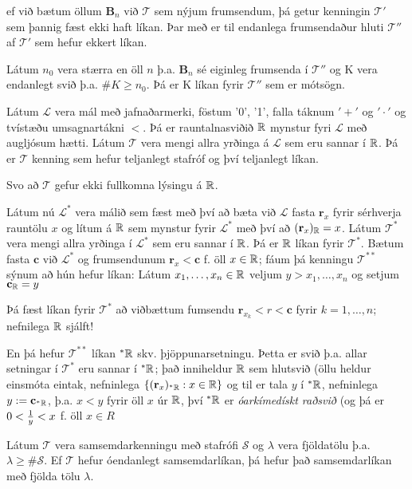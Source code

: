 \documentclass[12pt]{book}
\newcommand{\cT}{\mathcal{T}}
\newcommand{\cL}{\mathcal{L}}
\newcommand{\mb}[1]{\mathbf{#1}}
\newcommand{\mc}[1]{\mathcal{#1}}
\begin{document}
ef við bætum öllum $\mb{B}_n$ við $\cT$ sem nýjum frumsendum, þá getur kenningin
$\cT'$ sem þannig fæst ekki haft líkan. Þar með er til endanlega frumsendaður hluti
$\cT''$ af $\cT'$ sem hefur ekkert líkan.

Látum $n_0$ vera stærra en öll $n$ þ.a. $\mb{B}_n$ sé eiginleg frumsenda í
$\cT''$ og K vera endanlegt svið þ.a. $\#K \geq n_0$. Þá er K líkan fyrir
$\cT''$ sem er mótsögn.

\begin{daemi}
  Látum $\cL$ vera mál með jafnaðarmerki, föstum '0', '1',
  falla táknum $'+'$ og $'\cdot'$ og tvístæðu umsagnartákni $<$.
  Þá er rauntalnasviðið $\mathbb{R}$ mynstur fyri $\cL$ með augljósum hætti.
  Látum $\cT$ vera mengi allra yrðinga á $\cL$ sem eru sannar í $\mathbb{R}$.
  Þá er $\cT$ kenning sem hefur teljanlegt stafróf og því teljanlegt líkan.

  Svo að $\cT$ gefur ekki fullkomna lýsingu á $\mathbb{R}$.

  Látum nú $\cL^{*}$ vera málið sem fæst með því að bæta við $\cL$ fasta 
  $\mb{r}_x$ fyrir sérhverja rauntölu $x$ og lítum á $\mathbb{R}$
  sem mynstur fyrir $\cL^*$  með því að 
  $(\mb{r}_x)_{\R} = x$. Látum $\cT^*$ vera mengi allra
  yrðinga í $\cL^*$ sem eru sannar í $\mathbb{R}$.
  Þá er $\mathbb{R}$ líkan fyrir $\cT^*$. Bætum fasta $\mb{c}$ við 
  $\cL^*$ og frumsendunum $\mb{r}_x < \mb{c}$ f. öll
  $x \in \mathbb{R}$; fáum þá kenningu $\cT^{**}$ sýnum að hún hefur líkan:
  Látum $x_1, \dotsc, x_n \in \mathbb{R}$ veljum $y > x_1, \dotsc, x_n$
  og setjum $\mb{c}_{\R} = y$


  Þá fæst líkan fyrir $\cT^*$ að viðbættum fumsendu
  $\mb{r}_{x_k} < r < \mb{c}$ fyrir $k = 1, \dotsc, n$; nefnilega 
  $\mathbb{R}$ sjálft!

  En þá hefur $\cT^{**}$ líkan ${}^* \mathbb{R}$ skv. þjöppunarsetningu. Þetta er 
  svið þ.a. allar setningar í $\cT^*$ eru sannar í ${}^* \mathbb{R}$; það inniheldur
  $\mathbb{R}$ sem hlutsvið (öllu heldur einsmóta eintak, nefninlega 
  $\set{ (\mb{r}_x)_{{}^* \R}: x \in \R}$ og til er tala 
  $y$ í ${}^* \mathbb{R}$, nefninlega $y := \mb{c}_{{}^* \R}$,
  þ.a. $x < y$ fyrir öll $x$ úr $\mathbb{R}$, því ${}^* \mathbb{R}$ er
  \emph{óarkímedískt raðsvið} (og þá er $0 < \frac{1}{y} < x$ f. öll $x \in R$
\end{daemi}


\begin{setn}[Tarski]
  Látum $\cT$ vera samsemdarkenningu með stafrófi $\mc{S}$ 
  og $\lambda$  vera fjöldatölu þ.a. $\lambda \geq \# \mc{S}$.
  Ef $\cT$ hefur óendanlegt samsemdarlíkan, þá hefur það samsemdarlíkan með fjölda
  tölu $\lambda$.
\end{setn}
\end{document}
